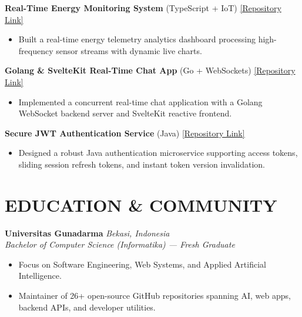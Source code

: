 \documentclass[10pt,a4paper]{article}
\begin{document}
\vspace{3pt}

\textbf{Real-Time Energy Monitoring System} (TypeScript + IoT) \hfill \href{https://github.com/caleheinzz25/realtime-energy-monitoring}{[Repository Link]}
\begin{itemize}
    \item Built a real-time energy telemetry analytics dashboard processing high-frequency sensor streams with dynamic live charts.
\end{itemize}

\vspace{3pt}

\textbf{Golang \& SvelteKit Real-Time Chat App} (Go + WebSockets) \hfill \href{https://github.com/caleheinzz25/golang-sveltekit-realtime-chatapp}{[Repository Link]}
\begin{itemize}
    \item Implemented a concurrent real-time chat application with a Golang WebSocket backend server and SvelteKit reactive frontend.
\end{itemize}

\vspace{3pt}

\textbf{Secure JWT Authentication Service} (Java) \hfill \href{https://github.com/caleheinzz25/jwt-auth-with-refreshToken-and-versionToken}{[Repository Link]}
\begin{itemize}
    \item Designed a robust Java authentication microservice supporting access tokens, sliding session refresh tokens, and instant token version invalidation.
\end{itemize}

\section{EDUCATION \& COMMUNITY}

\textbf{Universitas Gunadarma} \hfill \textit{Bekasi, Indonesia}\\
\textcolor{slateColor}{\textit{Bachelor of Computer Science (Informatika) — Fresh Graduate}}
\begin{itemize}
    \item Focus on Software Engineering, Web Systems, and Applied Artificial Intelligence.
    \item Maintainer of 26+ open-source GitHub repositories spanning AI, web apps, backend APIs, and developer utilities.
\end{itemize}
\end{document}
